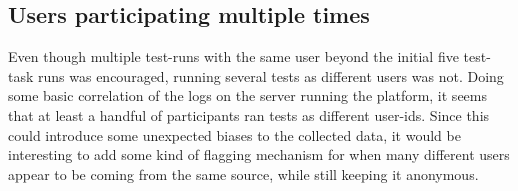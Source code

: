 
  \subsection{Users participating multiple times}

  Even though multiple test-runs with the same user beyond the initial five
  test-task runs was encouraged, running several tests as different users was
  not. Doing some basic correlation of the logs on the server running the
  platform, it seems that at least a handful of participants ran tests as
  different user-ids. Since this could introduce some unexpected biases to the
  collected data, it would be interesting to add some kind of flagging
  mechanism for when many different users appear to be coming from the same
  source, while still keeping it anonymous.
